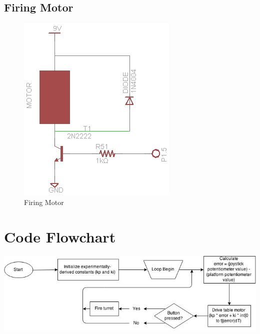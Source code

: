 \documentclass[a4paper, 11pt]{article}
\begin{document}
	\subsection{Firing Motor}
	\begin{figure}[!ht]
		\centering
		\includegraphics{proposal-images/firing-motor}
		\caption{Firing Motor}
	\end{figure}
\newpage
\section{Code Flowchart}
\bigskip
\begin{center}
	\includegraphics[width=7in]{proposal-images/group-turret-flowchart}
\end{center}
\end{document}
